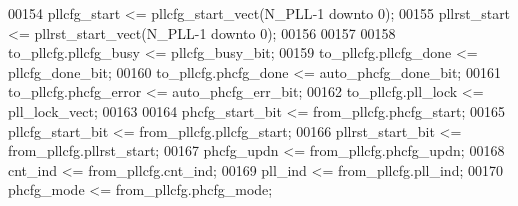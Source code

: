 \begin{DoxyCode}
00154 \textcolor{vhdlchar}{pllcfg_start} \textcolor{vhdlchar}{<=} \textcolor{vhdlchar}{pllcfg_start_vect}\textcolor{vhdlchar}{(}\textcolor{vhdlchar}{N_PLL}\textcolor{vhdlchar}{-}\textcolor{vhdllogic}{}\textcolor{vhdllogic}{1} \textcolor{keywordflow}{downto} \textcolor{vhdllogic}{}\textcolor{vhdllogic}{0}\textcolor{vhdlchar}{)};
00155 \textcolor{vhdlchar}{pllrst_start} \textcolor{vhdlchar}{<=} \textcolor{vhdlchar}{pllrst_start_vect}\textcolor{vhdlchar}{(}\textcolor{vhdlchar}{N_PLL}\textcolor{vhdlchar}{-}\textcolor{vhdllogic}{}\textcolor{vhdllogic}{1} \textcolor{keywordflow}{downto} \textcolor{vhdllogic}{}\textcolor{vhdllogic}{0}\textcolor{vhdlchar}{)};
00156 
00157 
00158 \textcolor{vhdlchar}{to_pllcfg}\textcolor{vhdlchar}{.}\textcolor{vhdlchar}{pllcfg_busy}   \textcolor{vhdlchar}{<=} \textcolor{vhdlchar}{pllcfg_busy_bit};
00159 \textcolor{vhdlchar}{to_pllcfg}\textcolor{vhdlchar}{.}\textcolor{vhdlchar}{pllcfg_done}   \textcolor{vhdlchar}{<=} \textcolor{vhdlchar}{pllcfg_done_bit};
00160 \textcolor{vhdlchar}{to_pllcfg}\textcolor{vhdlchar}{.}\textcolor{vhdlchar}{phcfg_done}    \textcolor{vhdlchar}{<=} \textcolor{vhdlchar}{auto_phcfg_done_bit};
00161 \textcolor{vhdlchar}{to_pllcfg}\textcolor{vhdlchar}{.}\textcolor{vhdlchar}{phcfg_error}   \textcolor{vhdlchar}{<=} \textcolor{vhdlchar}{auto_phcfg_err_bit};
00162 \textcolor{vhdlchar}{to_pllcfg}\textcolor{vhdlchar}{.}\textcolor{vhdlchar}{pll_lock}      \textcolor{vhdlchar}{<=} \textcolor{vhdlchar}{pll_lock_vect};
00163 
00164 \textcolor{vhdlchar}{phcfg_start_bit}         \textcolor{vhdlchar}{<=} \textcolor{vhdlchar}{from_pllcfg}\textcolor{vhdlchar}{.}\textcolor{vhdlchar}{phcfg_start};
00165 \textcolor{vhdlchar}{pllcfg_start_bit}        \textcolor{vhdlchar}{<=} \textcolor{vhdlchar}{from_pllcfg}\textcolor{vhdlchar}{.}\textcolor{vhdlchar}{pllcfg_start};
00166 \textcolor{vhdlchar}{pllrst_start_bit}        \textcolor{vhdlchar}{<=} \textcolor{vhdlchar}{from_pllcfg}\textcolor{vhdlchar}{.}\textcolor{vhdlchar}{pllrst_start};
00167 \textcolor{vhdlchar}{phcfg_updn}              \textcolor{vhdlchar}{<=} \textcolor{vhdlchar}{from_pllcfg}\textcolor{vhdlchar}{.}\textcolor{vhdlchar}{phcfg_updn};
00168 \textcolor{vhdlchar}{cnt_ind}                 \textcolor{vhdlchar}{<=} \textcolor{vhdlchar}{from_pllcfg}\textcolor{vhdlchar}{.}\textcolor{vhdlchar}{cnt_ind};
00169 \textcolor{vhdlchar}{pll_ind}                 \textcolor{vhdlchar}{<=} \textcolor{vhdlchar}{from_pllcfg}\textcolor{vhdlchar}{.}\textcolor{vhdlchar}{pll_ind};
00170 \textcolor{vhdlchar}{phcfg_mode}              \textcolor{vhdlchar}{<=} \textcolor{vhdlchar}{from_pllcfg}\textcolor{vhdlchar}{.}\textcolor{vhdlchar}{phcfg_mode};

\end{DoxyCode}
